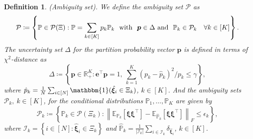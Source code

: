 \documentclass{article}
\newcommand{\PP}{\mathbb{P}}
\newcommand{\EE}{\mathbb{E}}
\newcommand{\RR}{\mathbb{R}}
\newtheorem{defi}{Definition}
\begin{document}
\begin{defi} 
\textup{(Ambiguity set).} 
We define the ambiguity set $\mathcal P$ as
\begin{equation}
\label{eq:ambiguity_set}
\mathcal P \coloneqq \left\{\PP \in \mathcal{P} (\Xi):\PP = \sum_{k \in [K]} p_k \PP_k \ \textup{  with  } \  \bm p \in \Delta \textup{ and } \ \PP_k \in \mathcal{P}_k \quad \forall k \in [K]
\right\}.
\end{equation}
The uncertainty set $\Delta$ for the partition probability vector $\bm p$ is defined in terms of $\chi^2$-distance as
\begin{equation}
\label{eq:ambiguity_set-prob}
\Delta \coloneqq \left\{\bm p \in \RR^K_{+} : \mathbf{e}^\top \bm p = 1, \ \sum_{k = 1}^{K} (p_k - \hat{p}_k)^2/p_k \leq \gamma
\right\},
\end{equation}
where $\hat{p}_k = \tfrac{1}{N}\sum_{i \in [N]}\mathbbm{1}(\hat{\bm \xi}_i \in \Xi_k)$, $k \in [K]$. And the ambiguity sets $\mathcal P_k, \ k \in [K]$, for the conditional distributions $\PP_1, \dots, \PP_K$ are given by
\begin{equation}
\label{eq:ambiguity_set-k}
\mathcal P_k \coloneqq \left\{\PP_k \in \mathcal{P} (\Xi_k): \left\| \EE_{\PP_k} [\bm\xi\bm\xi^\top] - \EE_{{\hat{\PP}}_k} [\bm\xi\bm\xi^\top] \right\|_F \leq \epsilon_k
\right\},
\end{equation}
where $\mathcal{I}_k = \left\{ i \in [N]: \hat{\bm \xi}_i \in \Xi_k\right \}$ and $\hat{\PP}_k = \frac{1}{|\mathcal{I}_k|} \sum_{i \in \mathcal{I}_k} \delta_{\hat{\bm \xi}_i}$, $k\in[K]$.
\end{defi}
\end{document}
